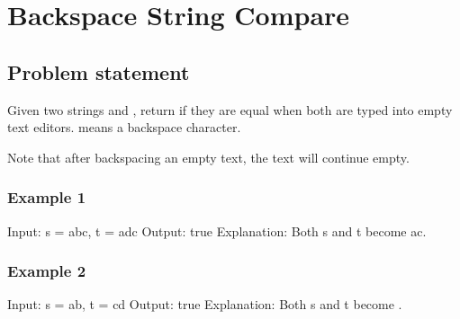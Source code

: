 \documentclass[letterpaper,12pt,english]{book}
\begin{document}
\sphinxstepscope


\section{Backspace String Compare}
\label{\detokenize{Stack/844_Backspace_String_Compare:backspace-string-compare}}\label{\detokenize{Stack/844_Backspace_String_Compare::doc}}

\subsection{Problem statement\sphinxfootnotemark[48]}
\label{\detokenize{Stack/844_Backspace_String_Compare:problem-statement}}%
\begin{footnotetext}[48]\sphinxAtStartFootnote
{}
%
\end{footnotetext}\ignorespaces 
\sphinxAtStartPar
Given two strings  and , return  if they are equal when both are typed into empty text editors. \sphinxcode{\sphinxupquote{\textquotesingle{}\#\textquotesingle{}}} means a backspace character.

\sphinxAtStartPar
Note that after backspacing an empty text, the text will continue empty.


\subsubsection{Example 1}
\label{\detokenize{Stack/844_Backspace_String_Compare:example-1}}
\begin{sphinxVerbatim}[commandchars=\\\{\}]
Input: s = \PYGZdq{}ab\PYGZsh{}c\PYGZdq{}, t = \PYGZdq{}ad\PYGZsh{}c\PYGZdq{}
Output: true
Explanation: Both s and t become \PYGZdq{}ac\PYGZdq{}.
\end{sphinxVerbatim}


\subsubsection{Example 2}
\label{\detokenize{Stack/844_Backspace_String_Compare:example-2}}
\begin{sphinxVerbatim}[commandchars=\\\{\}]
Input: s = \PYGZdq{}ab\PYGZsh{}\PYGZsh{}\PYGZdq{}, t = \PYGZdq{}c\PYGZsh{}d\PYGZsh{}\PYGZdq{}
Output: true
Explanation: Both s and t become \PYGZdq{}\PYGZdq{}.
\end{sphinxVerbatim}
\end{document}
